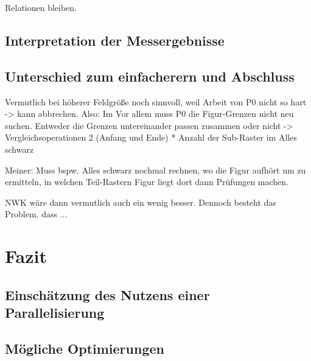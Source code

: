 \documentclass[
10pt, %
a4paper, %
oneside, %
headinclude,footinclude, %
BCOR5mm, %
]{scrartcl}
\begin{document}
 Relationen bleiben.
 
 
 \subsection{Interpretation der Messergebnisse}
 



\subsection{Unterschied zum einfacherern und Abschluss}
Vermutlich bei höherer Feldgröße noch sinnvoll, weil Arbeit von P0 nicht so hart -> kann abbrechen.
Also: Im 
Vor allem muss P0 die Figur-Grenzen nicht neu suchen.
Entweder die Grenzen untereinander passen zusammen oder nicht -> Vergleichsoperationen 2 (Anfang und Ende) * Anzahl der Sub-Raster im Alles schwarz

Meiner: Muss bspw. Alles schwarz nochmal rechnen, wo die Figur aufhört um zu ermitteln, in welchen Teil-Rastern Figur liegt dort dann Prüfungen machen.

NWK wäre dann vermutlich auch ein wenig besser. Dennoch besteht das Problem, dass ...



\section{Fazit}


\subsection{Einschätzung des Nutzens einer Parallelisierung}


\subsection{Mögliche Optimierungen}
\end{document}
